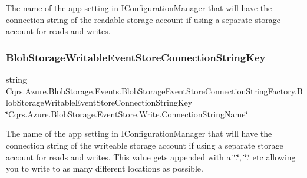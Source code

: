The name of the app setting in I\+Configuration\+Manager that will have the connection string of the readable storage account if using a separate storage account for reads and writes. 

\mbox{\label{classCqrs_1_1Azure_1_1BlobStorage_1_1Events_1_1BlobStorageEventStoreConnectionStringFactory_a3bf39254f211e4fbcbd9bc108c8d9fbc_a3bf39254f211e4fbcbd9bc108c8d9fbc}} 
\subsubsection{\texorpdfstring{Blob\+Storage\+Writable\+Event\+Store\+Connection\+String\+Key}{BlobStorageWritableEventStoreConnectionStringKey}}
{\footnotesize\ttfamily string Cqrs.\+Azure.\+Blob\+Storage.\+Events.\+Blob\+Storage\+Event\+Store\+Connection\+String\+Factory.\+Blob\+Storage\+Writable\+Event\+Store\+Connection\+String\+Key = \char`\"{}Cqrs.\+Azure.\+Blob\+Storage.\+Event\+Store.\+Write.\+Connection\+String\+Name\char`\"{}\hspace{0.3cm}{\ttfamily [static]}}



The name of the app setting in I\+Configuration\+Manager that will have the connection string of the writeable storage account if using a separate storage account for reads and writes. This value gets appended with a \char`\"{}.\char`\"{}, \char`\"{}.\char`\"{} etc allowing you to write to as many different locations as possible. 



